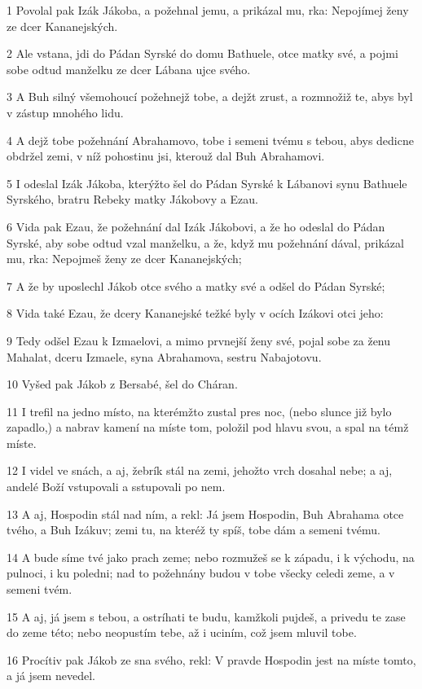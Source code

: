 \par 1 Povolal pak Izák Jákoba, a požehnal jemu, a prikázal mu, rka: Nepojímej ženy ze dcer Kananejských.
\par 2 Ale vstana, jdi do Pádan Syrské do domu Bathuele, otce matky své, a pojmi sobe odtud manželku ze dcer Lábana ujce svého.
\par 3 A Buh silný všemohoucí požehnejž tobe, a dejžt zrust, a rozmnožiž te, abys byl v zástup mnohého lidu.
\par 4 A dejž tobe požehnání Abrahamovo, tobe i semeni tvému s tebou, abys dedicne obdržel zemi, v níž pohostinu jsi, kterouž dal Buh Abrahamovi.
\par 5 I odeslal Izák Jákoba, kterýžto šel do Pádan Syrské k Lábanovi synu Bathuele Syrského, bratru Rebeky matky Jákobovy a Ezau.
\par 6 Vida pak Ezau, že požehnání dal Izák Jákobovi, a že ho odeslal do Pádan Syrské, aby sobe odtud vzal manželku, a že, když mu požehnání dával, prikázal mu, rka: Nepojmeš ženy ze dcer Kananejských;
\par 7 A že by uposlechl Jákob otce svého a matky své a odšel do Pádan Syrské;
\par 8 Vida také Ezau, že dcery Kananejské težké byly v ocích Izákovi otci jeho:
\par 9 Tedy odšel Ezau k Izmaelovi, a mimo prvnejší ženy své, pojal sobe za ženu Mahalat, dceru Izmaele, syna Abrahamova, sestru Nabajotovu.
\par 10 Vyšed pak Jákob z Bersabé, šel do Cháran.
\par 11 I trefil na jedno místo, na kterémžto zustal pres noc, (nebo slunce již bylo zapadlo,) a nabrav kamení na míste tom, položil pod hlavu svou, a spal na témž míste.
\par 12 I videl ve snách, a aj, žebrík stál na zemi, jehožto vrch dosahal nebe; a aj, andelé Boží vstupovali a sstupovali po nem.
\par 13 A aj, Hospodin stál nad ním, a rekl: Já jsem Hospodin, Buh Abrahama otce tvého, a Buh Izákuv; zemi tu, na kteréž ty spíš, tobe dám a semeni tvému.
\par 14 A bude síme tvé jako prach zeme; nebo rozmužeš se k západu, i k východu, na pulnoci, i ku poledni; nad to požehnány budou v tobe všecky celedi zeme, a v semeni tvém.
\par 15 A aj, já jsem s tebou, a ostríhati te budu, kamžkoli pujdeš, a privedu te zase do zeme této; nebo neopustím tebe, až i uciním, což jsem mluvil tobe.
\par 16 Procítiv pak Jákob ze sna svého, rekl: V pravde Hospodin jest na míste tomto, a já jsem nevedel.
